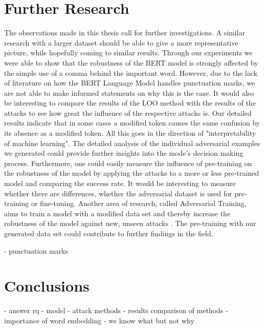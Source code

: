 
\section{Further Research}
The observations made in this thesis call for further investigations. 
A similar research with a larger dataset should be able to give a more representative picture, while hopefully coming to similar results. 
Through our experiments we were able to show that the robustness of the BERT model is strongly affected by the simple use of a comma behind the important word. However, due to the lack of literature on how the BERT Language Model handles punctuation marks, we are not able to make informed statements on why this is the case. It would also be interesting to compare the results of the LOO method with the results of the attacks to see how great the influence of the respective attacks is. Our detailed results indicate that in some cases a modified token causes the same confusion by its absence as a modified token. All this goes in the direction of "interpretability of machine learning". The detailed analysis of the individual adversarial examples we generated could provide further insights into the mode's decision making process.
Furthermore, one could easily measure the influence of pre-training on the robustness of the model by applying the attacks to a more or less pre-trained model and comparing the success rate. It would be interesting to measure whether there are differences, whether the adversarial dataset is used for pre-training or fine-tuning. Another area of research, called Adversarial Training, aims to train a model with a modified data set and thereby increase the robustness of the model against new, unseen attacks \cite{tramer2017ensemble}. The pre-training with our generated data set could contribute to further findings in the field. 


- punctuation marks


\section{Conclusions}

- answer rq
- model
- attack methods
- results comparison of methods
- importance of word embedding
- we know what but not why






\FloatBarrier


